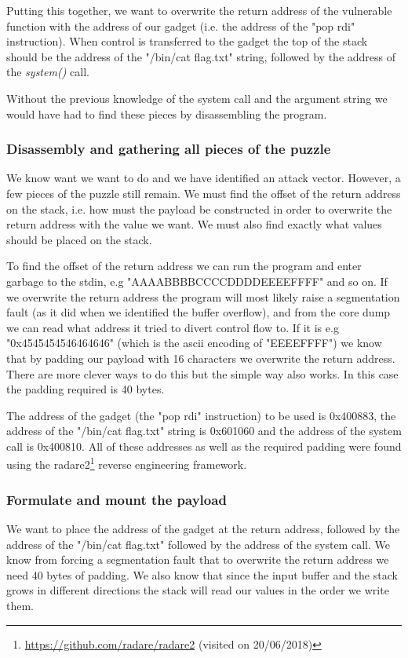 Putting this together, we want to overwrite the return address of the vulnerable function
with the address of our gadget (i.e. the address of the "pop rdi" instruction). When control
is transferred to the gadget the top of the stack should be the address of the "/bin/cat flag.txt"
string, followed by the address of the \textit{system()} call.

Without the previous knowledge of the system call and the argument string we would have had
to find these pieces by disassembling the program.

\subsubsection{Disassembly and gathering all pieces of the puzzle}

We know want we want to do and we have identified an attack vector. However, a few pieces
of the puzzle still remain. We must find the offset of the return address on the stack,
i.e. how must the payload be constructed in order to overwrite the return address with the
value we want. We must also find exactly what values should be placed on the stack.

To find the offset of the return address we can run the program and enter garbage to the
stdin, e.g "AAAABBBBCCCCDDDDEEEEFFFF" and so on. If we overwrite the return address the
program will most likely raise a segmentation fault (as it did when we identified the
buffer overflow), and from the core dump we can read what address it tried to divert
control flow to. If it is e.g "0x4545454546464646" (which is the ascii encoding of
"EEEEFFFF") we know that by padding our payload with 16 characters we overwrite the return
address. There are more clever ways to do this but the simple way also works. In this case
the padding required is 40 bytes.

The address of the gadget (the "pop rdi" instruction) to be used is 0x400883, the address
of the "/bin/cat flag.txt" string is 0x601060 and the address of the system call is
0x400810. All of these addresses as well as the required padding were found using the
radare2\footnote{\url{https://github.com/radare/radare2} (visited on 20/06/2018)} reverse engineering framework.

\subsubsection{Formulate and mount the payload}

We want to place the address of the gadget at the return address, followed by the address
of the "/bin/cat flag.txt" followed by the address of the system call. We know from
forcing a segmentation fault that to overwrite the return address we need 40 bytes of
padding. We also know that since the input buffer and the stack grows in different
directions the stack will read our values in the order we write them.

